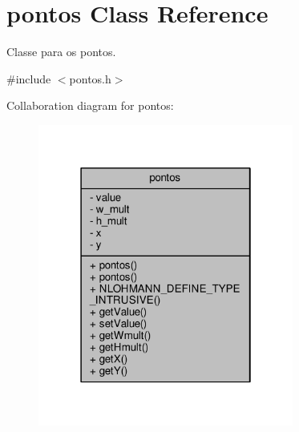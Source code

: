 \hypertarget{classpontos}{}\section{pontos Class Reference}
\label{classpontos}


Classe para os pontos.  




{\ttfamily \#include $<$pontos.\+h$>$}



Collaboration diagram for pontos\+:
\nopagebreak
\begin{figure}[H]
\begin{center}
\leavevmode
\includegraphics[width=238pt]{classpontos__coll__graph}
\end{center}
\end{figure}
